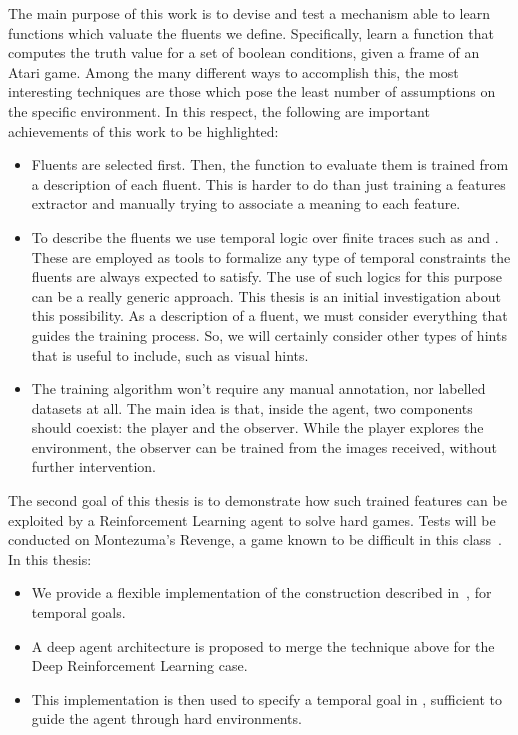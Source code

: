 The main purpose of this work is to devise and test a mechanism able to learn
functions which valuate the fluents we define.  Specifically, learn a
function that computes the truth value for a set of boolean conditions, given
a frame of an Atari game. Among the many different ways to accomplish this,
the most interesting techniques are those which pose the least number of
assumptions on the specific environment. In this respect, the following are
important achievements of this work to be highlighted:
\begin{itemize}
	\item Fluents are selected first. Then, the function to evaluate them is
		trained from a description of each fluent. This is harder to do than
		just training a features extractor and manually trying to associate a
		meaning to each feature.
	\item To describe the fluents we use temporal logic over finite traces such
		as \ltl{} and \ldl{}. These are employed as tools to formalize any type of
		temporal constraints the fluents are always expected to satisfy. The use
		of such logics for this purpose can be a really generic approach. This
		thesis is an initial investigation about this possibility. As a
		description of a fluent, we must consider everything that guides the
		training process. So, we will certainly consider other types of hints that
		is useful to include, such as visual hints.
	\item The training algorithm won't require any manual annotation, nor
		labelled datasets at all. The main idea is that, inside the agent, two
		components should coexist: the player and the observer. While the player 
		explores the environment, the observer can be trained from the images
		received, without further intervention.
\end{itemize}

The second goal of this thesis is to demonstrate how such trained features can
be exploited by a Reinforcement Learning agent to solve hard games. Tests will
be conducted on Montezuma's Revenge, a game known to be difficult in this
class~\cite{bib:atari-deepq-nature}. In this thesis:
\begin{itemize}
		\item We provide a flexible implementation of the construction described
			in~\cite{bib:degiacomo-logic-nmrdp}\cite{bib:favorito-thesis}, for
			temporal goals.
		\item A deep agent architecture is proposed to merge the technique above
			for the Deep Reinforcement Learning case.
		\item This implementation is then used to specify a temporal goal in
			\ldl{}, sufficient to guide the agent through hard environments.
\end{itemize}



